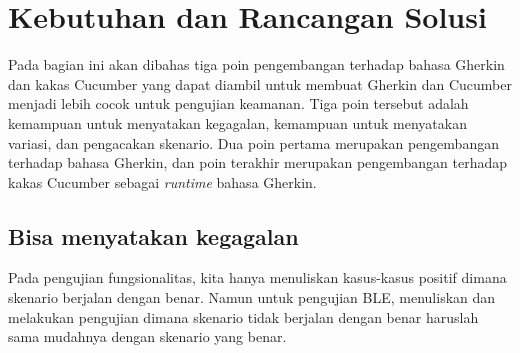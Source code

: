 






\section{Kebutuhan dan Rancangan Solusi}

Pada bagian ini akan dibahas tiga poin pengembangan terhadap bahasa Gherkin dan kakas Cucumber
yang dapat diambil untuk membuat Gherkin dan Cucumber menjadi lebih cocok untuk pengujian keamanan.
Tiga poin tersebut adalah kemampuan untuk menyatakan kegagalan, kemampuan untuk menyatakan variasi,
dan pengacakan skenario. Dua poin pertama merupakan pengembangan terhadap bahasa Gherkin, dan
poin terakhir merupakan pengembangan terhadap kakas Cucumber sebagai \emph{runtime} bahasa Gherkin.

\subsection{Bisa menyatakan kegagalan}

Pada pengujian fungsionalitas, kita hanya menuliskan kasus-kasus positif
dimana skenario berjalan dengan benar. Namun untuk pengujian BLE,
menuliskan dan melakukan pengujian dimana skenario tidak berjalan dengan benar
haruslah sama mudahnya dengan skenario yang benar.

